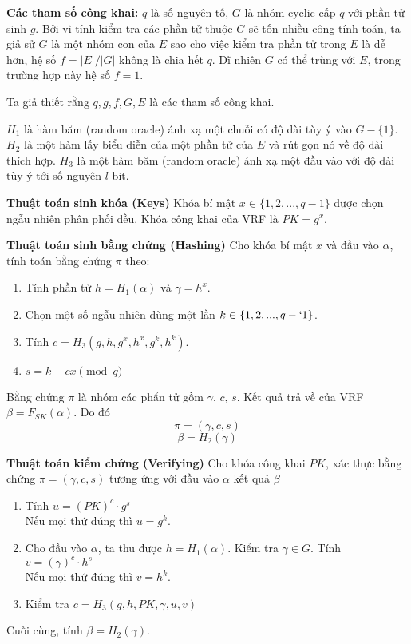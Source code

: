 \documentclass[../main.tex]{subfiles}
\begin{document}
\textbf{Các tham số công khai:} $q$ là số nguyên tố, $G$ là nhóm cyclic cấp $q$ với phần tử sinh $g$. Bởi vì tính kiểm tra các phần tử thuộc $G$ sẽ tốn nhiều công tính toán, ta giả sử $G$ là một nhóm con của $E$ sao cho việc kiểm tra phần tử trong $E$ là dễ hơn, hệ số $f = |E|/|G|$ không là chia hết $q$. Dĩ nhiên $G$ có thể trùng với $E$, trong trường hợp này hệ số $f = 1$. 

Ta giả thiết rằng $q,g,f,G,E$ là các tham số công khai.

$H_1$ là hàm băm (random oracle) ánh xạ một chuỗi có độ dài tùy ý vào $G-\{1\}$. $H_2$ là một hàm lấy biểu diễn của một phần tử của $E$ và rút gọn nó về độ dài thích hợp. $H_3$ là một hàm băm (random oracle) ánh xạ một đầu vào với độ dài tùy ý tới số nguyên $l$-bit.

\textbf{Thuật toán sinh khóa (Keys)} Khóa bí mật $x \in \{1,2,...,q-1\}$ được chọn ngẫu nhiên phân phối đều. Khóa công khai của VRF là $PK = g^x$.

\textbf{Thuật toán sinh bằng chứng (Hashing)} Cho khóa bí mật $x$ và đầu vào $\alpha$, tính toán bằng chứng $\pi$ theo:
\begin{enumerate}
    \item Tính phần tử $h = H_1(\alpha)$ và $\gamma = h^x$.
    \item Chọn một số ngẫu nhiên dùng một lần $k \in \{1,2,...,q-`1\}$.
    \item Tính $c = H_3(g,h,g^x,h^x,g^k,h^k)$.
    \item $s = k-cx\pmod q$ 
\end{enumerate}
Bằng chứng $\pi$ là nhóm các phẩn tử gồm $\gamma$, $c$, $s$. Kết quả trả về của VRF $\beta= F_{SK}(\alpha)$. Do đó
$$\pi =(\gamma,c,s)$$
$$\beta = H_2(\gamma)$$

\textbf{Thuật toán kiểm chứng (Verifying)} Cho khóa công khai $PK$, xác thực bằng chứng $\pi = (\gamma,c,s)$ tương ứng với đầu vào $\alpha$ kết quả $\beta$
\begin{enumerate}
    \item Tính $u = (PK)^c \cdot g^s$ \\
    Nếu mọi thứ đúng thì $u = g^k$.
    \item Cho đầu vào $\alpha$, ta thu được $h = H_1(\alpha)$. Kiểm tra $\gamma \in G$. Tính $v = (\gamma)^c\cdot h^s$ \\
    Nếu mọi thứ đúng thì $v = h^k$.
    \item Kiểm tra $c = H_3(g,h,PK,\gamma,u,v)$
\end{enumerate}
Cuối cùng, tính $\beta = H_2 (\gamma)$.
\end{document}
